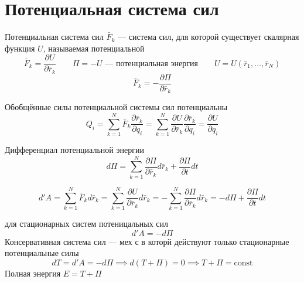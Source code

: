 \documentclass[crop=false]{standalone}
\begin{document}
\section{Потенциальная система сил}
\Def Потенциальная система сил $\bar F_k$ — система сил, для которой существует скалярная функция $U$, называемая потенциальной
\[\bar F_k = \frac{\partial U}{\partial \bar r_k}  \qquad \Pi = -U \text{ — потенциальная энергия} \qquad U = U(\bar r_1 , \dots , \bar r_N)\]
\[\bar F_k = - \frac{\partial \Pi}{\partial \bar r_k}\]

\keypoint
Обобщённые силы потенциальной системы сил потенциальны
\[Q_i = \sum_{k=1}^{N} \bar F_k \frac{\partial \bar r_k}{\partial q_i} = \sum_{k=1}^{N} \frac{\partial U}{\partial \bar r_k} \frac{\partial \bar r_k}{ \partial q_i} = \frac{\partial U}{\partial q_i}\]

\keypoint
Дифференциал потенциальной энергии
\[d \Pi = \sum_{k=1}^{N} \frac{\partial \Pi}{\partial \bar r_k} d \bar r_k + \frac{\partial \Pi}{\partial t} dt\]

\keypoint \[d' A = \sum_{k=1}^{N} \bar F_k d \bar r_k = \sum_{k=1}^{N} \frac{\partial U}{\partial \bar r_k} d \bar r_k = - \sum_{k=1}^{N} \frac{\partial \Pi}{\partial \bar r_k} d \bar r_k = - d \Pi + \frac{\partial \Pi}{\partial t} dt\]

\keypoint для стационарных систем потеницальных сил
\[d' A = - d \Pi\]
\Def Консервативная система сил — мех с в которй действуют только стационарные потенциальные силы
\[d T = d' A = - d \Pi \implies d(T  +\Pi) = 0 \implies T + \Pi = \text{const}\]
\Def Полная энергия $E = T + \Pi$
\end{document}
